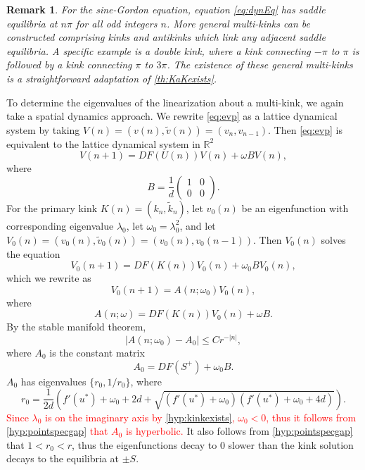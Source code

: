 \documentclass[12pt,reqno]{amsart}
\def\R{{\mathbb R}}
\newtheorem{remark}{Remark}
\newcommand{\revised}[1]{ \textcolor{red}{#1} }
\begin{document}
\begin{remark}\label{rem:SGmulitkinks}
For the sine-Gordon equation, equation \cref{eq:dynEq} has saddle equilibria at $n \pi$ for all odd integers $n$. More general multi-kinks can be constructed comprising kinks and antikinks which link any adjacent saddle equilibria. A specific example is a double kink, where a kink  connecting $-\pi$ to $\pi$ is followed by a kink connecting $\pi$ to $3 \pi$. The existence of these general multi-kinks is a straightforward adaptation of \cref{th:KaKexists}.
\end{remark}

To determine the eigenvalues of the linearization about a multi-kink, we again take a spatial dynamics approach. We rewrite \cref{eq:evp} as a lattice dynamical system by taking $V(n) = (v(n), \tilde{v}(n)) = (v_n, v_{n-1})$. Then \cref{eq:evp} is equivalent to the lattice dynamical system in $\R^2$
\begin{equation}\label{eq:EVPdyneq}
V(n+1) = D F( U(n) )V(n) + \omega B V(n),
\end{equation}
where
\[
B = \frac{1}{d}
\begin{pmatrix}1 & 0 \\ 0 & 0
\end{pmatrix}.
\] 
For the primary kink $K(n) = (k_n, \tilde{k}_n)$, let $v_0(n)$ be an eigenfunction with corresponding eigenvalue $\lambda_0$, let $\omega_0 = \lambda_0^2$, and let $V_0(n) = (v_0(n), \tilde{v}_0(n)) = (v_0(n), v_0(n-1))$. Then $V_0(n)$ solves the equation
\begin{equation}\label{eq:V0eq}
V_0(n+1) = D F( K(n) )V_0(n) + \omega_0 B V_0(n),
\end{equation}
which we rewrite as
\begin{equation}\label{eq:V0Aeq}
	V_0(n+1) = A(n; \omega_0) V_0(n),
\end{equation}
where
\begin{equation}\label{eq:Aomegaeq}
	A(n; \omega) = D F( K(n) )V_0(n) + \omega B.
\end{equation}
By the stable manifold theorem, 
\begin{equation}\label{eq:A0decay}
	|A(n; \omega_0) - A_0| \leq C r^{-|n|},
\end{equation}
where $A_0$ is the constant matrix
\begin{equation}
	A_0 = DF(S^+) + \omega_0 B.
\end{equation}
$A_0$ has eigenvalues $\{ r_0, 1/r_0 \}$, where
\begin{equation}\label{eq:r0}
r_0 = \frac{1}{2d}\left( f'(u^*) + \omega_0 + 2d + \sqrt{(f'(u^*)+ \omega_0)(f'(u^*) + \omega_0 + 4d)} \right).
\end{equation}
\revised{
Since $\lambda_0$ is on the imaginary axis by \cref{hyp:kinkexists}, $\omega_0 < 0$, thus it follows from \cref{hyp:pointspecgap} that $A_0$ is hyperbolic.
}
It also follows from \cref{hyp:pointspecgap} that $1 < r_0 < r$, thus the eigenfunctions decay to 0 slower than the kink solution decays to the equilibria at $\pm S$.
\end{document}
